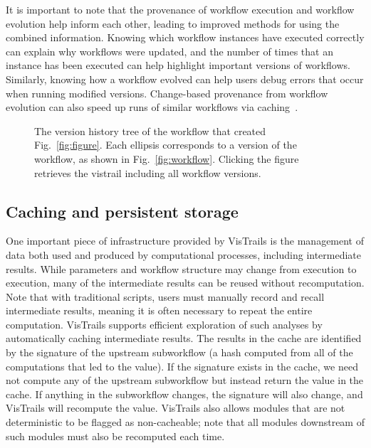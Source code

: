 \documentclass[12pt]{iopart}
\begin{document}
It is important to note that the provenance of workflow execution and
workflow evolution help inform each other, leading to improved methods
for using the combined information. Knowing which workflow instances
have executed correctly can explain why workflows were updated, and
the number of times that an instance has been executed can help
highlight important versions of workflows. Similarly, knowing how a
workflow evolved can help users debug errors that occur when running
modified versions. Change-based provenance from workflow evolution
can also speed up runs of similar workflows via
caching~\cite{bavoil@vis2005}.



\begin{figure}
\begin{center}
\caption{The version history tree of the workflow that created Fig.~\ref{fig:figure}. Each ellipsis corresponds to a version of the workflow, as shown in Fig.~\ref{fig:workflow}. Clicking the figure retrieves the vistrail including all workflow versions.}
\label{fig:history}
\end{center}
\end{figure}


\subsection{Caching and persistent storage}


One important piece of infrastructure provided by VisTrails is the
management of data both used and produced by computational processes,
including intermediate results. While parameters and workflow
structure may change from execution to execution, many of the
intermediate results can be reused without recomputation. Note that
with traditional scripts, users must manually record and recall
intermediate results, meaning it is often necessary to repeat the
entire computation. VisTrails supports efficient exploration of such
analyses by automatically caching intermediate results. The results
in the cache are identified by the signature of the upstream
subworkflow (a hash computed from all of the computations that led to
the value). If the signature exists in the cache, we need not compute
any of the upstream subworkflow but instead return the value in the
cache. If anything in the subworkflow changes, the signature will
also change, and VisTrails will recompute the value. VisTrails also
allows modules that are not deterministic to be flagged as
non-cacheable; note that all modules downstream of such modules must
also be recomputed each time.
\end{document}
